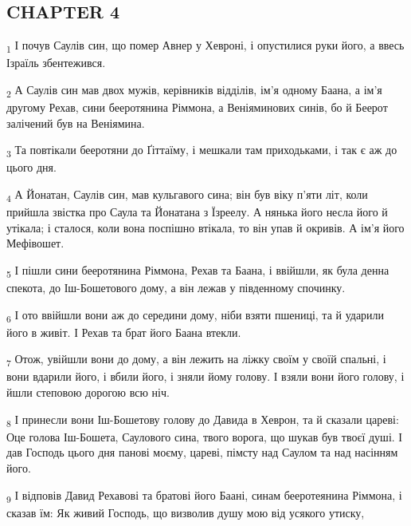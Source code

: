 \subsection{CHAPTER 4}
\begin{tcolorbox}
\textsubscript{1} І почув Саулів син, що помер Авнер у Хевроні, і опустилися руки його, а ввесь Ізраїль збентежився.
\end{tcolorbox}
\begin{tcolorbox}
\textsubscript{2} А Саулів син мав двох мужів, керівників відділів, ім'я одному Баана, а ім'я другому Рехав, сини бееротянина Ріммона, а Веніяминових синів, бо й Беерот залічений був на Веніямина.
\end{tcolorbox}
\begin{tcolorbox}
\textsubscript{3} Та повтікали бееротяни до Ґіттаїму, і мешкали там приходьками, і так є аж до цього дня.
\end{tcolorbox}
\begin{tcolorbox}
\textsubscript{4} А Йонатан, Саулів син, мав кульгавого сина; він був віку п'яти літ, коли прийшла звістка про Саула та Йонатана з Їзреелу. А нянька його несла його й утікала; і сталося, коли вона поспішно втікала, то він упав й окривів. А ім'я його Мефівошет.
\end{tcolorbox}
\begin{tcolorbox}
\textsubscript{5} І пішли сини бееротянина Ріммона, Рехав та Баана, і ввійшли, як була денна спекота, до Іш-Бошетового дому, а він лежав у південному спочинку.
\end{tcolorbox}
\begin{tcolorbox}
\textsubscript{6} І ото ввійшли вони аж до середини дому, ніби взяти пшениці, та й ударили його в живіт. І Рехав та брат його Баана втекли.
\end{tcolorbox}
\begin{tcolorbox}
\textsubscript{7} Отож, увійшли вони до дому, а він лежить на ліжку своїм у своїй спальні, і вони вдарили його, і вбили його, і зняли йому голову. І взяли вони його голову, і йшли степовою дорогою всю ніч.
\end{tcolorbox}
\begin{tcolorbox}
\textsubscript{8} І принесли вони Іш-Бошетову голову до Давида в Хеврон, та й сказали цареві: Оце голова Іш-Бошета, Саулового сина, твого ворога, що шукав був твоєї душі. І дав Господь цього дня панові моєму, цареві, пімсту над Саулом та над насінням його.
\end{tcolorbox}
\begin{tcolorbox}
\textsubscript{9} І відповів Давид Рехавові та братові його Баані, синам бееротеянина Ріммона, і сказав їм: Як живий Господь, що визволив душу мою від усякого утиску,
\end{tcolorbox}
